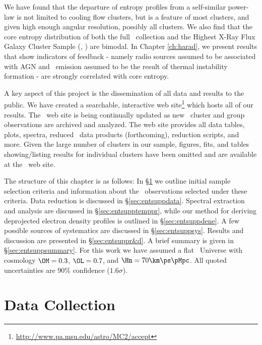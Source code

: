 We have found that the departure of entropy profiles from a
self-similar power-law is not limited to cooling flow clusters, but is
a feature of most clusters, and given high enough angular resolution,
possibly all clusters. We also find that the core entropy distribution
of both the full \accept\ collection and the Highest X-Ray Flux Galaxy
Cluster Sample (\hifl, \citealt{hiflugcs1, hiflugcs2}) are bimodal. In
Chapter \ref{ch:harad}, we present results that show indicators of
feedback - namely radio sources assumed to be associated with AGN and
\halpha\ emission assumed to be the result of thermal instability
formation - are strongly correlated with core entropy.

A key aspect of this project is the dissemination of all data and
results to the public. We have created a searchable, interactive web
site\footnote{\url{http://www.pa.msu.edu/astro/MC2/accept}} which
hosts all of our results. The \accept\ web site is being continually
updated as new \chandra\ cluster and group observations are archived
and analyzed. The web site provides all data tables, plots, spectra,
reduced \chandra\ data products (forthcoming), reduction scripts, and
more. Given the large number of clusters in our sample, figures, fits,
and tables showing/listing results for individual clusters have been
omitted and are available at the \accept\ web site.

The structure of this chapter is as follows: In
\S\ref{sec:entsuppsample} we outline initial sample selection criteria
and information about the \chandra\ observations selected under these
criteria. Data reduction is discussed in
\S\ref{sec:entsuppdata}. Spectral extraction and analysis are
discussed in \S\ref{sec:entsupptemppr}, while our method for deriving
deprojected electron density profiles is outlined in
\S\ref{sec:entsuppdene}. A few possible sources of systematics are
discussed in \S\ref{sec:entsuppsys}. Results and discussion are
presented in \S\ref{sec:entsuppr&d}. A brief summary is given in
\S\ref{sec:entsuppsummary}. For this work we have assumed a flat
\LCDM\ Universe with cosmology $\OM=0.3$, $\OL=0.7$, and
$\Hn=70\km\ps\pMpc$. All quoted uncertainties are 90\% confidence
($1.6\sigma$).

\section{Data Collection}
\label{sec:entsuppsample}

